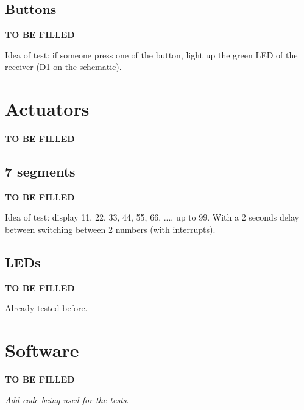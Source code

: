 \documentclass[a4paper, 11pt, oneside]{article}
\begin{document}
\subsection{Buttons}
\textbf{TO BE FILLED} \par
Idea of test: if someone press one of the button, light up the green LED of the receiver (D1 on the schematic).


\section{Actuators}
\paragraph{}\textbf{TO BE FILLED}

\subsection{7 segments}
\textbf{TO BE FILLED} \par
Idea of test: display 11, 22, 33, 44, 55, 66, ..., up to 99. With a 2 seconds delay between switching between 2 numbers (with interrupts).

\subsection{LEDs}
\textbf{TO BE FILLED} \par
Already tested before.


\section{Software}
\textbf{TO BE FILLED} \par
\textit{Add code being used for the tests}.
\end{document}
